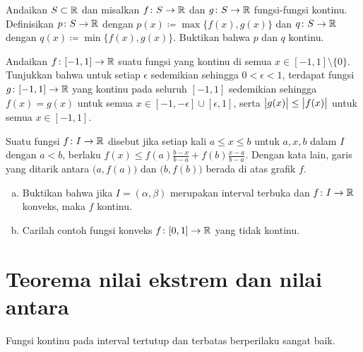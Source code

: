 \begin{exercise} \label{exercise:minmaxcont}
Andaikan $S \subset {\mathbb{R}}$ dan
misalkan $f \colon S \to {\mathbb{R}}$ dan
$g \colon S \to {\mathbb{R}}$ fungsi-fungsi kontinu.
Definisikan $p \colon S \to {\mathbb{R}}$ dengan
$p(x) \coloneqq \max \bigl\{ f(x) , g(x) \bigr\}$ dan
$q \colon S \to {\mathbb{R}}$ dengan
$q(x) \coloneqq \min \bigl\{ f(x) , g(x) \bigr\}$.  Buktikan bahwa $p$ dan $q$
kontinu.
\end{exercise}

\begin{exercise}
Andaikan $f \colon [-1,1] \to {\mathbb{R}}$ suatu fungsi yang kontinu di semua $x \in
[-1,1] \setminus \{ 0 \}$.  Tunjukkan bahwa untuk setiap $\epsilon$ sedemikian
sehingga $0 < \epsilon < 1$, terdapat
fungsi $g \colon [-1,1] \to {\mathbb{R}}$ yang kontinu pada seluruh $[-1,1]$ sedemikian sehingga
$f(x) = g(x)$ untuk semua $x \in [-1,-\epsilon] \cup [\epsilon,1]$, serta 
$\bigl\lvert {g(x)} \bigr\rvert \leq \bigl\lvert {f(x)} \bigr\rvert$ untuk semua $x \in [-1,1]$.
\end{exercise}

\begin{exercise}[Menantang]
Suatu fungsi $f \colon I \to {\mathbb{R}}$ disebut \emph{} jika
setiap kali $a \leq x \leq b$ untuk $a,x,b$ dalam $I$ dengan $a<b$, berlaku
$f(x) \leq f(a) \frac{b-x}{b-a} + f(b) \frac{x-a}{b-a}$.  Dengan kata lain,
garis yang ditarik antara $\bigl(a,f(a)\bigr)$ dan $\bigl(b,f(b)\bigr)$ 
berada di atas grafik $f$.
\begin{enumerate}[a)]
\item
Buktikan bahwa
jika $I = (\alpha,\beta)$ merupakan interval terbuka dan $f \colon I \to {\mathbb{R}}$ konveks,
maka $f$ kontinu.
\item
Carilah contoh fungsi konveks $f \colon [0,1] \to {\mathbb{R}}$ yang
tidak kontinu.
\end{enumerate}
\end{exercise}



\sectionnewpage
\section{Teorema nilai ekstrem dan nilai antara}
\label{sec:minmaxint}



Fungsi kontinu pada interval tertutup dan terbatas
berperilaku sangat baik.

